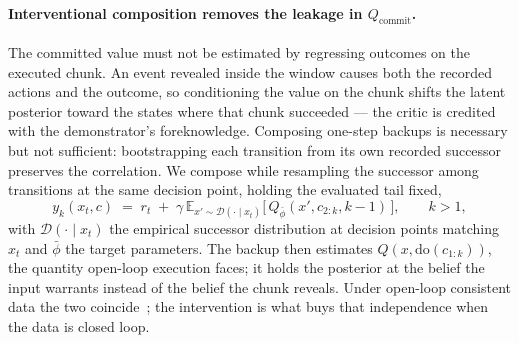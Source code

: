 \paragraph{Interventional composition removes the leakage in $Q_{\mathrm{commit}}$.}
The committed value must not be estimated by regressing outcomes on the executed chunk. An event
revealed inside the window causes both the recorded actions and the outcome, so conditioning the value
on the chunk shifts the latent posterior toward the states where that chunk succeeded --- the critic
is credited with the demonstrator's foreknowledge. Composing one-step backups is necessary but not
sufficient: bootstrapping each transition from its own recorded successor preserves the correlation.
We compose while resampling the successor among transitions at the same decision point, holding the
evaluated tail fixed,
\begin{equation}
\label{eq:rcv-interv}
y_k(x_t, c) \;=\; r_t \;+\; \gamma\, \mathbb E_{x' \sim \mathcal{D}(\cdot \mid x_t)}
\big[\, Q_{\bar\phi}(x', c_{2:k}, k-1) \,\big],
\qquad k > 1,
\end{equation}
with $\mathcal D(\cdot\mid x_t)$ the empirical successor distribution at decision points matching
$x_t$ and $\bar\phi$ the target parameters. The backup then estimates $Q(x,\mathrm{do}(c_{1:k}))$,
the quantity open-loop execution faces; it holds the posterior at the belief the input warrants
instead of the belief the chunk reveals. Under open-loop consistent data the two coincide~\citep{dqc};
the intervention is what buys that independence when the data is closed loop.

